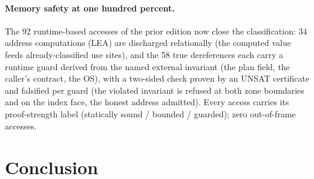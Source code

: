 \documentclass[11pt,a4paper]{article}
\begin{document}
\paragraph{Memory safety at one hundred percent.} The 92
runtime-based accesses of the prior edition now close the
classification: 34 address computations (LEA) are discharged
relationally (the computed value feeds already-classified use
sites), and the 58 true dereferences each carry a runtime guard
derived from the named external invariant (the plan field, the
caller's contract, the OS), with a two-sided check proven by an
UNSAT certificate and falsified per guard (the violated invariant is
refused at both zone boundaries and on the index face, the honest
address admitted). Every access carries its proof-strength label
(statically sound / bounded / guarded); zero out-of-frame accesses.

\section{Conclusion}\label{sec:conclusion}
\end{document}
